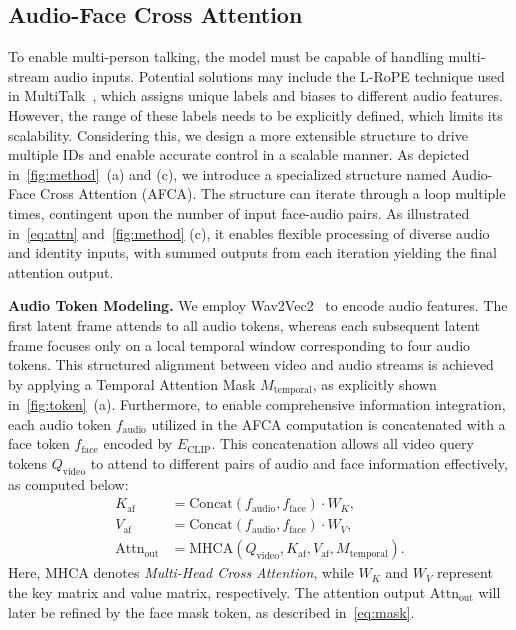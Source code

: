 \subsection{Audio-Face Cross Attention}
\label{subsec:audio-face-attn}
To enable multi-person talking, the model must be capable of handling multi-stream audio inputs.
Potential solutions may include the L-RoPE technique used in MultiTalk~\cite{kong2025let}, which assigns unique labels and biases to different audio features.
However, the range of these labels needs to be explicitly defined, which limits its scalability.
Considering this, we design a more extensible structure to drive multiple IDs and enable accurate control in a scalable manner.
As depicted in~\cref{fig:method}~(a) and (c), we introduce a specialized structure named Audio-Face Cross Attention (AFCA). 
The structure can iterate through a loop multiple times, contingent upon the number of input face-audio pairs. 
As illustrated in~\cref{eq:attn} and~\cref{fig:method} (c), it enables flexible processing of diverse audio and identity inputs, with summed outputs from each iteration yielding the final attention output.

\noindent \textbf{Audio Token Modeling.}
We employ Wav2Vec2~\cite{baevski2020wav2vec} to encode audio features. 
The first latent frame attends to all audio tokens, whereas each subsequent latent frame focuses only on a local temporal window corresponding to four audio tokens. 
This structured alignment between video and audio streams is achieved by applying a Temporal Attention Mask \( M_{\text{temporal}} \), as explicitly shown in~\cref{fig:token}~(a). 
Furthermore, to enable comprehensive information integration, each audio token \( f_{\text{audio}} \) utilized in the AFCA computation is concatenated with a face token \( f_{\text{face}} \) encoded by \( E_{\text{CLIP}} \).
This concatenation allows all video query tokens \( Q_{\text{video}} \) to attend to different pairs of audio and face information effectively, as computed below:
\begin{equation}
\label{eq:af-attention}
\begin{aligned}
    K_{\text{af}} &= \text{Concat}(f_{\text{audio}}, f_{\text{face}})\cdot W_K, \\
    V_{\text{af}} &= \text{Concat}(f_{\text{audio}}, f_{\text{face}})\cdot W_V, \\
    \text{Attn}_{\text{out}} &= \text{MHCA}(Q_{\text{video}}, K_{\text{af}}, V_{\text{af}}, M_{\text{temporal}}).
\end{aligned}
\end{equation}
Here, MHCA denotes \textit{Multi-Head Cross Attention}, while $W_K$ and $W_V$ represent the key matrix and value matrix, respectively.
The attention output $\text{Attn}_{\text{out}}$ will later be refined by the face mask token, as described in~\cref{eq:mask}.


